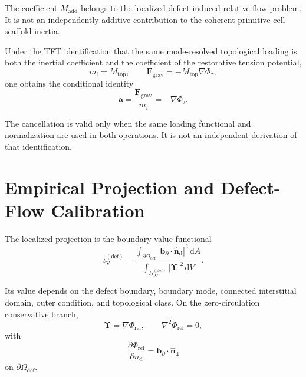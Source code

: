 The coefficient $M_{\mathrm{add}}$ belongs to the localized defect-induced relative-flow problem. It is not an independently additive contribution to the coherent primitive-cell scaffold inertia.

Under the TFT identification that the same mode-resolved topological loading is both the inertial coefficient and the coefficient of the restorative tension potential,
\begin{equation}
    m_{\mathrm{i}} = M_{\mathrm{top}}, \qquad \mathbf{F}_{\mathrm{grav}} = -M_{\mathrm{top}}\nabla\Phi_{\tau},
\end{equation}
one obtains the conditional identity
\begin{equation}
    \mathbf{a} = \frac{\mathbf{F}_{\mathrm{grav}}}{m_{\mathrm{i}}} = -\nabla\Phi_{\tau}.
\end{equation}

The cancellation is valid only when the same loading functional and normalization are used in both operations. It is not an independent derivation of that identification.

\section[Empirical Projection and Calibration]{Empirical Projection and Defect-Flow Calibration}
\label{sec:AP_empirical_projection}

The localized projection is the boundary-value functional
\begin{equation}
    \iota_{\mathrm{V}}^{(\mathrm{def})} = \frac{\displaystyle\int_{\partial\Omega_{\mathrm{def}}}|\mathbf{b}_{\partial}\cdot\hat{\mathbf{n}}_{\mathrm{d}}|^2\,\mathrm{d}A} {\displaystyle\int_{\Omega_{\mathrm{IC}}^{(\mathrm{def})}}|\boldsymbol{\Upsilon}|^2\,\mathrm{d}V}.
\end{equation}

Its value depends on the defect boundary, boundary mode, connected interstitial domain, outer condition, and topological class. On the zero-circulation conservative branch,
\begin{equation}
    \boldsymbol{\Upsilon} = \nabla\Phi_{\mathrm{rel}}, \qquad \nabla^2\Phi_{\mathrm{rel}} = 0,
\end{equation}
with
\begin{equation}
    \frac{\partial\Phi_{\mathrm{rel}}}{\partial n_{\mathrm{d}}} = \mathbf{b}_{\partial}\cdot\hat{\mathbf{n}}_{\mathrm{d}}
\end{equation}
on $\partial\Omega_{\mathrm{def}}$.

